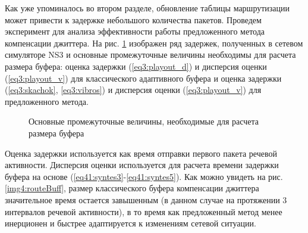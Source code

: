 Как уже упоминалось во втором разделе, обновление таблицы маршрутизации может привести к задержке небольшого количества пакетов. Проведем эксперимент для анализа эффективности работы предложенного метода компенсации джиттера. 
На рис. \ref{img4:routeEst} изображен ряд задержек, полученных в сетевом симуляторе NS3 и основные промежуточные величины необходимы для расчета размера буфера: 
оценка задержки (\ref{eq3:playout_d}) и дисперсия оценки (\ref{eq3:playout_v}) для  классического адаптивного буфера \cite{Ramjee} и 
оценка задержки (\ref{eq3:skachok}, \ref{eq3:vibros}) и дисперсия оценки (\ref{eq3:playout_v}) для предложенного метода.






\pgfplotsset{width=15cm, height=10cm, compat=1.3}
\begin{figure} [!ht]
  \center
{}
\caption{Основные промежуточные величины, необходимые для расчета размера буфера}
  \label{img4:routeEst}
\end{figure}


Оценка задержки используется как время отправки первого пакета речевой активности.
Дисперсия оценки используется для расчета времени задержки буфера на основе (\ref{eq41:syntes3}-\ref{eq41:syntes5}).
Как можно увидеть на рис. \ref{img4:routeBuff}, размер классического буфера компенсации джиттера значительное время остается завышенным (в данном случае на протяжении 3 интервалов речевой активности),
в то время как предложенный метод менее инерционен и быстрее адаптируется к изменениям сетевой ситуации.

